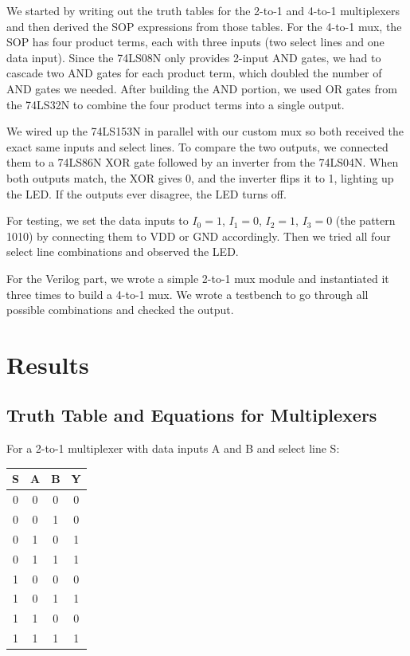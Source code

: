 \documentclass[12pt, letterpaper]{article}
\begin{document}
We started by writing out the truth tables for the 2-to-1 and 4-to-1 multiplexers and then derived the SOP expressions from those tables. For the 4-to-1 mux, the SOP has four product terms, each with three inputs (two select lines and one data input). Since the 74LS08N only provides 2-input AND gates, we had to cascade two AND gates for each product term, which doubled the number of AND gates we needed. After building the AND portion, we used OR gates from the 74LS32N to combine the four product terms into a single output.

We wired up the 74LS153N in parallel with our custom mux so both received the exact same inputs and select lines. To compare the two outputs, we connected them to a 74LS86N XOR gate followed by an inverter from the 74LS04N. When both outputs match, the XOR gives 0, and the inverter flips it to 1, lighting up the LED. If the outputs ever disagree, the LED turns off.

For testing, we set the data inputs to $I_0 = 1$, $I_1 = 0$, $I_2 = 1$, $I_3 = 0$ (the pattern 1010) by connecting them to VDD or GND accordingly. Then we tried all four select line combinations and observed the LED.

For the Verilog part, we wrote a simple 2-to-1 mux module and instantiated it three times to build a 4-to-1 mux. We wrote a testbench to go through all possible combinations and checked the output.

\section{Results}

\subsection{Truth Table and Equations for Multiplexers}

For a 2-to-1 multiplexer with data inputs A and B and select line S:

\begin{center}
  \begin{tabular}{|c|c|c|c|}
    \hline
    S & A & B & Y \\
    \hline
    0 & 0 & 0 & 0 \\
    0 & 0 & 1 & 0 \\
    0 & 1 & 0 & 1 \\
    0 & 1 & 1 & 1 \\
    1 & 0 & 0 & 0 \\
    1 & 0 & 1 & 1 \\
    1 & 1 & 0 & 0 \\
    1 & 1 & 1 & 1 \\
    \hline
  \end{tabular}
\end{center}
\end{document}

